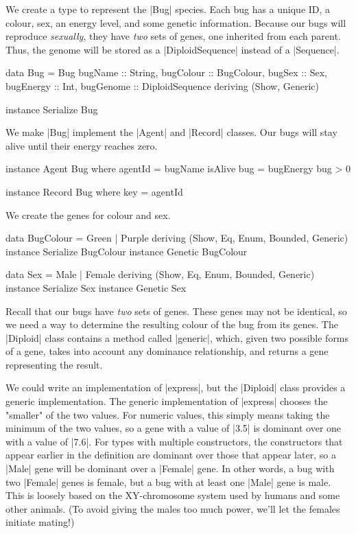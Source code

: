 We create a type to represent the |Bug| species.
Each bug has a unique ID, a colour, sex, an energy level,
and some genetic information.
Because our bugs will reproduce \emph{sexually}, they have \emph{two} sets of genes, 
one inherited from each parent.
Thus, the genome will be stored as
a |DiploidSequence| instead of a |Sequence|.

\begin{code}
data Bug = Bug
  { 
    bugName :: String,
    bugColour :: BugColour,
    bugSex :: Sex,
    bugEnergy :: Int,
    bugGenome :: DiploidSequence
  } deriving (Show, Generic)

instance Serialize Bug
\end{code} 

We make |Bug| implement the |Agent| 
and |Record| classes.
Our bugs will stay alive until their energy reaches zero.

\begin{code}
instance Agent Bug where
  agentId = bugName
  isAlive bug = bugEnergy bug > 0

instance Record Bug where key = agentId
\end{code} 

We create the genes for colour and sex.

\begin{code}
data BugColour = Green | Purple
  deriving (Show, Eq, Enum, Bounded, Generic)
instance Serialize BugColour
instance Genetic BugColour

data Sex = Male | Female
  deriving (Show, Eq, Enum, Bounded, Generic)
instance Serialize Sex
instance Genetic Sex
\end{code} 

Recall that our bugs have \emph{two} sets of genes.
These genes may not be identical,
so we need a way to determine the resulting colour of the bug
from its genes.
The |Diploid| class contains a method called |generic|, which, 
given two possible forms of a gene, takes into account any dominance relationship,
and returns a gene representing the result.

We could write an implementation of |express|,
but the |Diploid| class provides a generic implementation.
The generic implementation of |express| chooses the "smaller" of the two values.
For numeric values, this simply means taking the minimum of the two values,
so a gene with a value of |3.5| is dominant over one with a value of |7.6|.
For types with multiple constructors, the constructors that appear
earlier in the definition are dominant over those that appear later,
so a |Male| gene will be dominant over a |Female| gene.
In other words, a bug with two |Female| genes is female, but a bug with at least one 
|Male| gene is male.
This is loosely based on the XY-chromosome system used by
humans and some other animals.
(To avoid giving the males too much power, we'll let the females initiate mating!)

